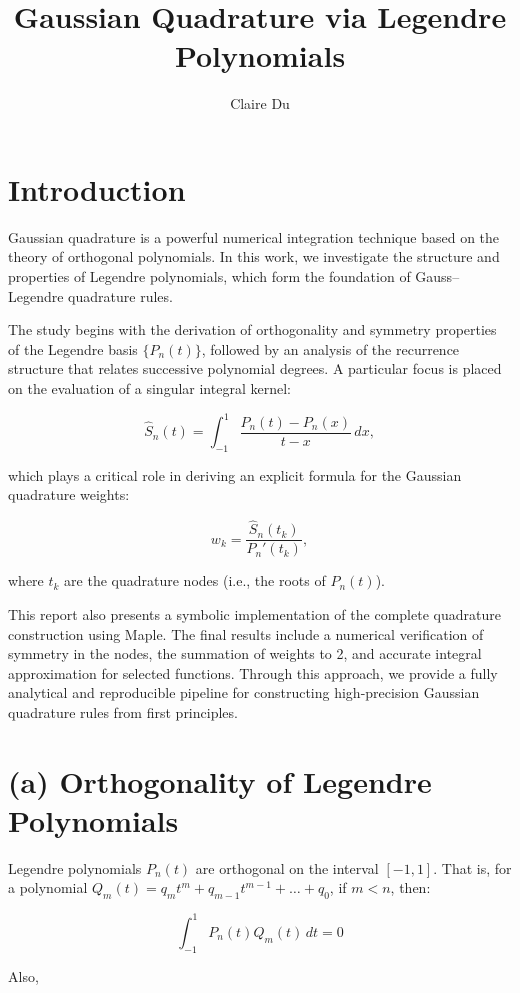 \documentclass{article}
\title{Gaussian Quadrature via Legendre Polynomials}
\author{Claire Du}
\date{}
\begin{document}
\maketitle

\section{Introduction}

Gaussian quadrature is a powerful numerical integration technique based on the theory of orthogonal polynomials. In this work, we investigate the structure and properties of Legendre polynomials, which form the foundation of Gauss–Legendre quadrature rules.

The study begins with the derivation of orthogonality and symmetry properties of the Legendre basis \( \{ P_n(t) \} \), followed by an analysis of the recurrence structure that relates successive polynomial degrees. A particular focus is placed on the evaluation of a singular integral kernel:

\[
\hat{S}_n(t) = \int_{-1}^{1} \frac{P_n(t) - P_n(x)}{t - x} \, dx,
\]

which plays a critical role in deriving an explicit formula for the Gaussian quadrature weights:

\[
w_k = \frac{\hat{S}_n(t_k)}{P_n'(t_k)},
\]

where \( t_k \) are the quadrature nodes (i.e., the roots of \( P_n(t) \)).

This report also presents a symbolic implementation of the complete quadrature construction using Maple. The final results include a numerical verification of symmetry in the nodes, the summation of weights to 2, and accurate integral approximation for selected functions. Through this approach, we provide a fully analytical and reproducible pipeline for constructing high-precision Gaussian quadrature rules from first principles.

\section*{(a) Orthogonality of Legendre Polynomials}

Legendre polynomials \( P_n(t) \) are orthogonal on the interval \([ -1, 1 ]\). That is, for a polynomial \( Q_m(t) = q_m t^m + q_{m-1} t^{m-1} + \dots + q_0 \), if \( m < n \), then:

\[
\int_{-1}^{1} P_n(t) Q_m(t) \, dt = 0
\]

Also,
\end{document}
